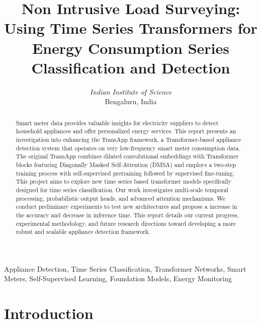 \documentclass[conference]{IEEEtran}
\begin{document}
\title{Non Intrusive Load Surveying: Using Time Series Transformers for Energy Consumption Series Classification and Detection\\
}

\author{
\textit{Indian Institute of Science}\\
Bengaluru, India \\
}


\maketitle

\begin{abstract}
Smart meter data provides valuable insights for electricity suppliers to detect household appliances and offer personalized energy services. This report presents an investigation into enhancing the TransApp framework, a Transformer-based appliance detection system that operates on very low-frequency smart meter consumption data. The original TransApp combines dilated convolutional embeddings with Transformer blocks featuring Diagonally Masked Self-Attention (DMSA) and employs a two-step training process with self-supervised pretraining followed by supervised fine-tuning. This project aims to explore new time series based transformer models specifically designed for time series classification. Our work investigates multi-scale temporal processing, probabilistic output heads, and advanced attention mechanisms. We conduct preliminary experiments to test new architectures and propose a increase in the accuracy and decrease in inference time. This report details our current progress, experimental methodology, and future research directions toward developing a more robust and scalable appliance detection framework.
\end{abstract}

\begin{IEEEkeywords}
Appliance Detection, Time Series Classification, Transformer Networks, Smart Meters, Self-Supervised Learning, Foundation Models, Energy Monitoring
\end{IEEEkeywords}

\section{Introduction}
\label{sec:introduction}
\end{document}
